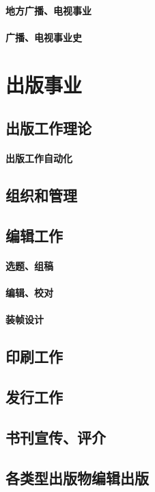 \documentclass[UTF8]{../../ApplicationUniverse}
\begin{document}
        \subsubsection{地方广播、电视事业}
        \subsubsection{广播、电视事业史}
   





\chapter{出版事业}
\section{出版工作理论}
    \subsubsection{出版工作自动化}
\section{组织和管理}
\section{编辑工作}
    \subsubsection{选题、组稿}
    \subsubsection{编辑、校对}
    \subsubsection{装帧设计}
\section{印刷工作}
\section{发行工作}
\section{书刊宣传、评介}
    \section{各类型出版物编辑出版}
\end{document}
